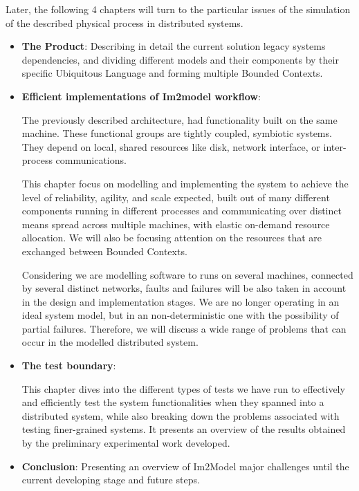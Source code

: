 \documentclass[
  oneside,
  11pt, a4paper,
  footinclude=true,
  headinclude=true,
  cleardoublepage=empty
]{scrbook}
\begin{document}
    Later, the following 4 chapters will turn to the particular issues of the simulation of the described physical process in distributed systems.
\begin{itemize}

    \item \textbf{The Product}:
    Describing in detail the current solution legacy systems dependencies, and dividing different models and their components by their specific Ubiquitous Language and forming multiple Bounded Contexts.\\
    

    
    \item \textbf{Efficient implementations of Im2model workflow}:
    
    
    The previously described architecture, had functionality built on the same machine. These functional groups are tightly coupled, symbiotic systems. They depend on local, shared resources like disk, network interface, or inter-process communications. \par

    This chapter focus on modelling and implementing the system to achieve the level of reliability, agility, and scale expected, built out of many different components running in different processes and communicating over distinct means spread across multiple machines, 
    with elastic \/ on-demand resource allocation. We will also be focusing attention on the resources that are exchanged between Bounded Contexts.\par
    Considering we are modelling software to runs on several machines, connected by several distinct networks, faults and failures will be also taken in account in the design and implementation stages. We are no longer operating in an ideal system model, but in an non-deterministic one with the possibility of partial failures. Therefore, we will discuss a wide range of problems that can occur in the modelled distributed system.    \par

    
        \item \textbf{The test boundary}:  
        
        This chapter dives into the different types of tests we have run to effectively and efficiently test the system functionalities when they spanned into a distributed system, while also breaking down the problems associated with testing finer-grained systems. It presents an overview of the  results obtained by
the preliminary experimental work developed.

            \item \textbf{Conclusion}: Presenting an overview of  Im2Model major challenges until the current developing stage and future steps.


\end{itemize}
\end{document}
